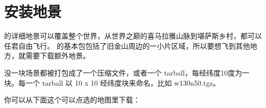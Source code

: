 \ifchinese
\section{安装地景}
\fi

\ifchinese
\FlightGear{} 的详细地景可以覆盖整个世界，从世界之巅的喜马拉雅山脉到堪萨斯乡村，都可以任君自由飞行。\FlightGear{}  的基本包包括了旧金山周边的一小片区域，所以要想飞到其他地方，就需要下载额外地景。

没一块场景都被打包成了一个压缩文件，或者一个 tarball，每经纬度10度为一块。每一个 tarball 以 10 x 10 经纬度块来命名，比如 w130n50.tgz。

你可以从下面这个可以点选的地图里下载：
\fi
%
%

